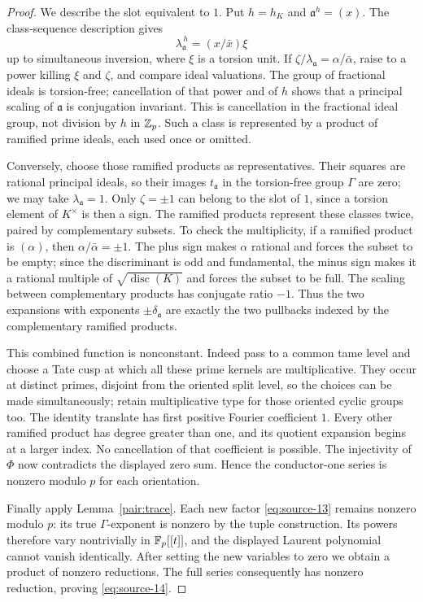 \begin{proof}
We describe the slot equivalent to \(1\).  Put \(h=h_K\) and
\(\mathfrak a^h=(x)\).  The class-sequence description gives
\[
 \lambda_{\mathfrak a}^{\,h}
       =(x/\bar x)\xi
\]
up to simultaneous inversion, where \(\xi\) is a torsion unit.
If \(\zeta/\lambda_{\mathfrak a}=\alpha/\bar\alpha\), raise to a
power killing \(\xi\) and \(\zeta\), and compare ideal valuations.
The group of fractional ideals is torsion-free; cancellation of
that power and of \(h\) shows that a principal scaling of
\(\mathfrak a\) is conjugation invariant.  This is cancellation in
the fractional ideal group, not division by \(h\) in \(\mathbb Z_p\).
Such a class is represented by a product of ramified prime ideals,
each used once or omitted.

Conversely, choose those ramified products as representatives.
Their squares are rational principal ideals, so their images
\(t_{\mathfrak a}\) in the torsion-free group \(\Gamma\) are zero;
we may take \(\lambda_{\mathfrak a}=1\).
Only \(\zeta=\pm1\) can belong to the slot of \(1\), since a torsion
element of \(K^\times\) is then a sign.
The ramified products represent these classes twice, paired by
complementary subsets.  To check the multiplicity, if a ramified
product is \((\alpha)\), then \(\alpha/\bar\alpha=\pm1\).
The plus sign makes \(\alpha\) rational and forces the subset to be
empty; since the discriminant is odd and fundamental, the minus
sign makes it a rational multiple of
\(\sqrt{\operatorname{disc}(K)}\) and forces the subset to be full.
The scaling between complementary products has conjugate ratio
\(-1\).  Thus the two expansions with exponents
\(\pm\delta_{\mathfrak a}\) are exactly the two pullbacks indexed
by the complementary ramified products.

This combined function is nonconstant.  Indeed pass to a common
tame level and choose a Tate cusp at which all these prime kernels
are multiplicative.  They occur at distinct primes, disjoint from
the oriented split level, so the choices can be made simultaneously;
retain multiplicative type for those oriented cyclic groups too.
The identity translate has first positive Fourier coefficient
\(1\).  Every other ramified product has degree greater than one,
and its quotient expansion begins at a larger index.  No cancellation
of that coefficient is possible.
The injectivity of \(\Phi\) now contradicts the displayed zero sum.
Hence the conductor-one series is nonzero modulo \(p\) for each
orientation.

Finally apply Lemma~\ref{pair:trace}.  Each new factor
\eqref{eq:source-13} remains nonzero modulo \(p\): its true
\(\Gamma\)-exponent is nonzero by the tuple construction.
Its powers therefore vary nontrivially in \(\mathbb F_p[[t]]\), and the
displayed Laurent polynomial cannot vanish identically.
After setting the new variables to zero we obtain a product of
nonzero reductions.  The full series consequently has nonzero
reduction, proving \eqref{eq:source-14}.
\end{proof}

